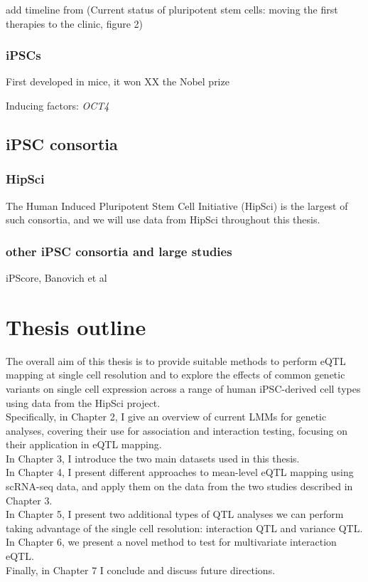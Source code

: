 add timeline from (Current status of pluripotent stem cells: moving the first therapies to the clinic,  figure 2)

\cite{kimbrel2015current}

\subsubsection{iPSCs}

First developed in mice, it won XX the Nobel prize

Inducing factors:
\textit{OCT4}


\subsection{iPSC consortia}

\subsubsection{HipSci}
The Human Induced Pluripotent Stem Cell Initiative (HipSci) is the largest of such consortia, and we will use data from HipSci throughout this thesis.

\subsubsection{other iPSC consortia and large studies}

iPScore, Banovich et al

\newpage

\section{Thesis outline}

The overall aim of this thesis is to provide suitable methods to perform eQTL mapping at single cell resolution and to explore the effects of common genetic variants on single cell expression across a range of human iPSC-derived cell types using data from the HipSci project.\\

Specifically, in Chapter 2, I give an overview of current LMMs for genetic analyses, covering their use for association and interaction testing, focusing on their application in eQTL mapping.\\

In Chapter 3, I introduce the two main datasets used in this thesis. \\

In Chapter 4, I present different approaches to mean-level eQTL mapping using scRNA-seq data, and apply them on the data from the two studies described in Chapter 3. \\

In Chapter 5, I present two additional types of QTL analyses we can perform taking advantage of the single cell resolution: interaction QTL and variance QTL. \\

In Chapter 6, we present a novel method to test for multivariate interaction eQTL. \\

Finally, in Chapter 7 I conclude and discuss future directions.